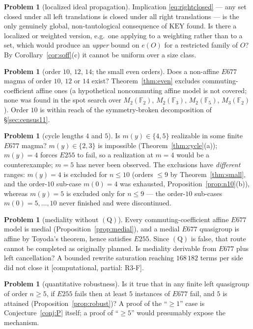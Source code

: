 \documentclass[11pt]{article}
\theoremstyle{plain}
\theoremstyle{definition}
\newtheorem{problem}[theorem]{Problem}
\theoremstyle{remark}
\numberwithin{equation}{section}
\newcommand{\F}{\mathbb{F}}
\newcommand{\statusbox}[1]{{\small\sloppy\textsf{[#1]}}}
\newcommand{\PARTIAL}[1]{\statusbox{computational, partial: #1}}
\begin{document}
\begin{problem}[localized ideal propagation]
Implication \eqref{eq:rightclosed} --- any set closed under all left translations is closed
under all right translations --- is the only genuinely global, non-tautological consequence of
$\mathrm{KEY}$ found. Is there a localized or weighted version, e.g.\ one applying to a
weighting rather than to a set, which would produce an \emph{upper} bound on $e(O)$ for a
restricted family of $O$? By Corollary~\ref{cor:soff}(c) it cannot be uniform over a size
class.
\end{problem}

\begin{problem}[order $10$, $12$, $14$; the small even orders]
Does a non-affine $E677$ magma of order $10$, $12$ or $14$ exist? Theorem~\ref{thm:even}
excludes commuting-coefficient affine ones (a hypothetical noncommuting affine model is not
covered; none was found in the spot search over $M_2(\F_2)$, $M_2(\F_3)$, $M_2(\F_5)$,
$M_3(\F_2)$). Order $10$ is within reach of the symmetry-broken decomposition of
\S\ref{sec:census11}.
\end{problem}

\begin{problem}[cycle lengths $4$ and $5$]
Is $m(y)\in\{4,5\}$ realizable in some finite $E677$ magma? $m(y)\in\{2,3\}$ is impossible
(Theorem~\ref{thm:cycle}(a)); $m(y)=4$ forces $E255$ to fail, so a realization at $m=4$ would
be a counterexample; $m=5$ has never been observed. The exclusions have \emph{different}
ranges: $m(y)=4$ is excluded for $n\le 10$ (orders $\le9$ by Theorem~\ref{thm:small}, and the
order-$10$ sub-case $m(0)=4$ was exhausted, Proposition~\ref{prop:n10}(b)), whereas $m(y)=5$
is excluded only for $n\le 9$ --- the order-$10$ sub-cases $m(0)=5,\dots,10$ never finished
and were discontinued.
\end{problem}

\begin{problem}[mediality without $(\mathrm{Q})$]
Every commuting-coefficient affine $E677$ model is medial (Proposition~\ref{prop:medial}),
and a medial $E677$ quasigroup is affine by Toyoda's theorem, hence satisfies $E255$. Since $(\mathrm{Q})$ is
false, that route cannot be completed as originally planned. Is mediality derivable from
$E677$ plus left cancellation? A bounded rewrite saturation reaching $168\,182$ terms per side
did not close it \PARTIAL{R3-F}.
\end{problem}

\begin{problem}[quantitative robustness]
Is it true that in any finite left quasigroup of order $n\ge5$, if $E255$ fails then at least
$5$ instances of $E677$ fail, and $5$ is attained (Proposition~\ref{prop:robust})? A proof of
the ``$\ge1$'' case is Conjecture~\ref{conj:P} itself; a proof of ``$\ge5$'' would presumably
expose the mechanism.
\end{problem}
\end{document}
